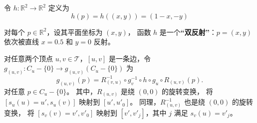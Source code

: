 \documentclass{ctexart}
\begin{document}
		令 $h:\mathbb{R}^2\rightarrow \mathbb{R}^2$ 定义为
		\begin{equation}
			h(p) = h((x,y)) = (1-x, -y)
		\end{equation}

		对每个 $p\in \mathbb{R}^2$，设其平面坐标为 $(x,y)$，
		函数 $h$ 是一个\textbf{“双反射”}：$p=(x,y)$ 依次被直线 $x=0.5$ 和 $y=0$ 反射。

		对任意两个顶点 $u,v\in \mathcal{T}$，$[u,v]$ 是一条边，令
		$g_{(u,v)}: C_u-\{0\}\rightarrow g_{(u,v)}(C_u-\{0\})$
		为
		\begin{equation}
			g_{(u,v)}(p) = R_{(v,u)}^{-1}\circ g_v^{-1}\circ h\circ g_u\circ R_{(u,v)}(p).
		\end{equation}
		对任意 $p\in C_u-\{0\}$。
		其中，$R_{(u,v)}$ 是绕 $(0,0)$ 的旋转变换，
		将 $[s_u(u) = u', s_u(v)]$ 映射到 $[u',u'_0]$。
		同理，$R_{(u,v)}^{-1}$ 也是绕 $(0,0)$ 的旋转变换，
		将 $[s_v(v) = v', v'_0]$ 映射到 $[v',v'_j]$，其中 $j$ 满足 $s_v(u) = v'_j$。

		
\end{document}
